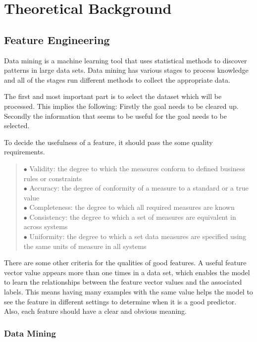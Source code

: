 \chapter{Theoretical Background}

\section{Feature Engineering}

Data mining is a machine learning tool that uses statistical methods to discover patterns in large data sets. Data mining has various stages to process knowledge and all of the stages run different methods to collect the appropriate data.\medskip

The first and most important part is to select the dataset which will be processed. This implies the following: Firstly the goal needs to be cleared up. Secondly the information that seems to be useful for the goal needs to be selected. \medskip

\noindent To decide the usefulness of a feature, it should pass the some quality requirements.
\begin{verse}
	$\bullet$ Validity: the degree to which the measures conform to defined business rules or constraints\\
	$\bullet$ Accuracy: the degree of conformity of a measure to a standard or a true value\\
	$\bullet$ Completeness: the degree to which all required measures are known\\
	$\bullet$ Consistency: the degree to which a set of measures are equivalent in across systems\\
	$\bullet$ Uniformity: the degree to which a set data measures are specified using the same units of measure in all systems
\end{verse}

There are some other criteria for the qualities of good features. A useful feature vector value appears more than one times in a data set, which enables the model to learn the relationships between the feature vector values and the associated labels. This means having many examples with the same value helps the model to see the feature in different settings to determine when it is a good predictor. Also, each feature should have a clear and obvious meaning.


\subsection{Data Mining}

